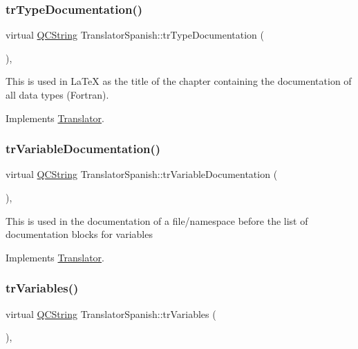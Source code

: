 \subsubsection{\texorpdfstring{trTypeDocumentation()}{trTypeDocumentation()}}
{\footnotesize\ttfamily virtual \mbox{\hyperlink{class_q_c_string}{Q\+C\+String}} Translator\+Spanish\+::tr\+Type\+Documentation (\begin{DoxyParamCaption}{ }\end{DoxyParamCaption})\hspace{0.3cm}{\ttfamily [inline]}, {\ttfamily [virtual]}}

This is used in La\+TeX as the title of the chapter containing the documentation of all data types (Fortran). 

Implements \mbox{\hyperlink{class_translator}{Translator}}.

\mbox{\label{class_translator_spanish_a5dbe3b93acf1767de5d0e471a8d8382a}} 
\subsubsection{\texorpdfstring{trVariableDocumentation()}{trVariableDocumentation()}}
{\footnotesize\ttfamily virtual \mbox{\hyperlink{class_q_c_string}{Q\+C\+String}} Translator\+Spanish\+::tr\+Variable\+Documentation (\begin{DoxyParamCaption}{ }\end{DoxyParamCaption})\hspace{0.3cm}{\ttfamily [inline]}, {\ttfamily [virtual]}}

This is used in the documentation of a file/namespace before the list of documentation blocks for variables 

Implements \mbox{\hyperlink{class_translator}{Translator}}.

\mbox{\label{class_translator_spanish_a38491bc51e912d2d12447395c37c03e1}} 
\subsubsection{\texorpdfstring{trVariables()}{trVariables()}}
{\footnotesize\ttfamily virtual \mbox{\hyperlink{class_q_c_string}{Q\+C\+String}} Translator\+Spanish\+::tr\+Variables (\begin{DoxyParamCaption}{ }\end{DoxyParamCaption})\hspace{0.3cm}{\ttfamily [inline]}, {\ttfamily [virtual]}}

